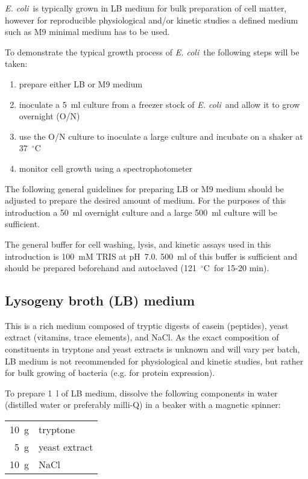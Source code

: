\documentclass[a4paper]{article}
\newcommand{\dc}{~$^{\circ}$C}
\newcommand{\ec}{\textit{E. coli}}
\begin{document}
\begin{multicols}{2}
\ec\ is typically grown in LB medium for bulk preparation of cell matter,
however for reproducible physiological and/or kinetic studies a defined medium
such as M9 minimal medium has to be used.

To demonstrate the typical growth process of \ec\ the following steps will be
taken:

\begin{enumerate}
\item prepare either LB or M9 medium
\item inoculate a 5~ml culture from a freezer stock of \ec\ and allow it to grow overnight (O/N)
\item use the O/N culture to inoculate a large culture and incubate on a shaker at 37\dc
\item monitor cell growth using a spectrophotometer
\end{enumerate}

The following general guidelines for preparing LB or M9 medium should be
adjusted to prepare the desired amount of medium. For the purposes of this
introduction a 50~ml overnight culture and a large 500~ml culture will be
sufficient.

The general buffer for cell washing, lysis, and kinetic assays used in this
introduction is 100~mM TRIS at pH~7.0. 500~ml of this buffer is sufficient and
should be prepared beforehand and autoclaved (121\dc\ for 15-20 min).

\subsection{Lysogeny broth (LB) medium} 

This is a rich medium composed of tryptic digests of casein (peptides), yeast
extract (vitamins, trace elements), and NaCl. As the exact composition of
constituents in tryptone and yeast extracts is unknown and will vary per batch,
LB medium is not recommended for physiological and kinetic studies, but rather
for bulk growing of bacteria (e.g. for protein expression).

To prepare 1~l of LB medium, dissolve the following components in water
(distilled water or preferably milli-Q) in a beaker with a magnetic spinner:

\begin{center}
\begin{tabular}[h]{rl} \toprule
10~g    &tryptone \\ 
5~g     &yeast extract\\ 
10~g    &NaCl\\ \bottomrule
\end{tabular}
\end{center}


\end{multicols}
\end{document}
